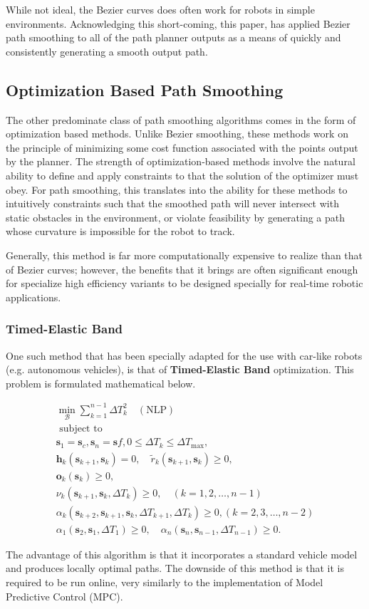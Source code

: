 While not ideal, the Bezier curves does often work for robots in simple environments. Acknowledging this short-coming, this paper, has applied Bezier path smoothing to all of the path planner outputs as a means of quickly and consistently generating a smooth output path.


\subsection{Optimization Based Path Smoothing}
The other predominate class of path smoothing algorithms comes in the form of optimization based methods. Unlike Bezier smoothing, these methods work on the principle of minimizing some cost function associated with the points output by the planner. The strength of optimization-based methods involve the natural ability to define and apply constraints to that the solution of the optimizer must obey. For path smoothing, this translates into the ability for these methods to intuitively constraints such that the smoothed path will never intersect with static obstacles in the environment, or violate feasibility by generating a path whose curvature is impossible for the robot to track.

Generally, this method is far more computationally expensive to realize than that of Bezier curves; however, the benefits that it brings are often significant enough for specialize high efficiency variants to be designed specially for real-time robotic applications. 

\subsubsection{Timed-Elastic Band}
One such method that has been specially adapted for the use with car-like robots (e.g. autonomous vehicles), is that of \textbf{Timed-Elastic Band} optimization. This problem is formulated mathematical below.  

\begin{equation}
    \begin{array}{l}
    \min _{\mathcal{B}} \sum_{k=1}^{n-1} \Delta T_k^2 \quad(\mathrm{NLP}) \\
    \text { subject to } \\
    \mathbf{s}_1=\mathbf{s}_c, \mathbf{s}_n=\mathbf{s} f, 0 \leq \Delta T_k \leq \Delta T_{\max }, \\
    \mathbf{h}_k\left(\mathbf{s}_{k+1}, \mathbf{s}_k\right)=0, \quad \tilde{r}_k\left(\mathbf{s}_{k+1}, \mathbf{s}_k\right) \geq 0, \\
    \mathbf{o}_k\left(\mathbf{s}_k\right) \geq 0, \\
    \nu_k\left(\mathbf{s}_{k+1}, \mathbf{s}_k, \Delta T_k\right) \geq 0, \quad(k=1,2, \ldots, n-1) \\
    \alpha_k\left(\mathbf{s}_{k+2}, \mathbf{s}_{k+1}, \mathbf{s}_k, \Delta T_{k+1}, \Delta T_k\right) \geq 0,(k=2,3, \ldots, n-2) \\
    \alpha_1\left(\mathbf{s}_2, \mathbf{s}_1, \Delta T_1\right) \geq 0, \quad \alpha_n\left(\mathbf{s}_n, \mathbf{s}_{n-1}, \Delta T_{n-1}\right) \geq 0 .
    \end{array}
    \end{equation}

The advantage of this algorithm is that it incorporates a standard vehicle model and produces locally optimal paths. The downside of this method is that it is required to be run online, very similarly to the implementation of Model Predictive Control (MPC).



